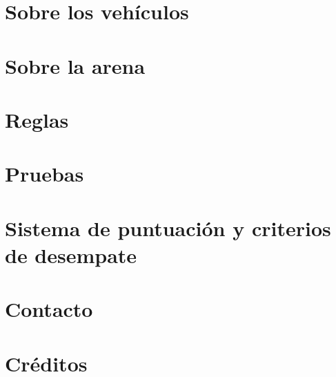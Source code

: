 \documentclass[letterpaper,12pt]{article}
\begin{document}
\section{Sobre los vehículos}


\section{Sobre la arena}

\section{Reglas}

\section{Pruebas}

\section{Sistema de puntuación y criterios de desempate}

\section{Contacto}

\section*{Créditos}
\end{document}
